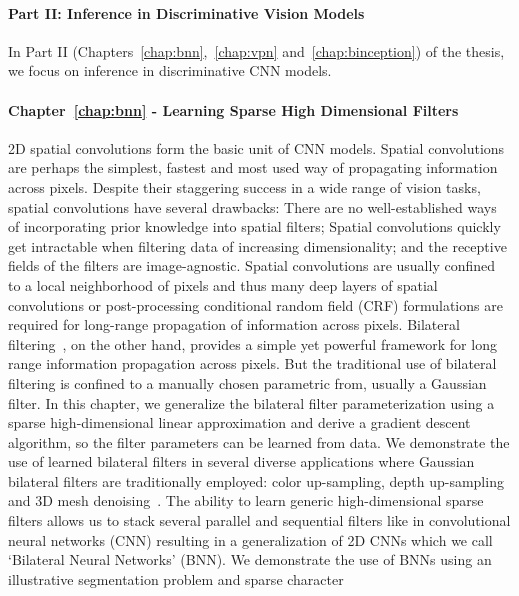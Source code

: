 \vspace{-0.3cm}
\paragraph{Part II: Inference in Discriminative Vision Models}
In Part II (Chapters~\ref{chap:bnn},~\ref{chap:vpn} and~\ref{chap:binception}) of the
thesis, we focus on inference in discriminative CNN models.

\vspace{-0.3cm}
\paragraph{Chapter~\ref{chap:bnn} - Learning Sparse High Dimensional Filters}
2D spatial convolutions form the basic unit of CNN models.
Spatial convolutions are perhaps the simplest, fastest and
most used way of propagating information across pixels.
Despite their staggering success in a
wide range of vision tasks, spatial convolutions have several drawbacks: There
are no well-established ways of incorporating prior knowledge into spatial filters;
Spatial convolutions quickly get intractable when filtering data of
increasing dimensionality; and the receptive fields of the filters are image-agnostic.
Spatial convolutions are usually confined to a local neighborhood
of pixels and thus many deep layers of spatial convolutions or post-processing conditional
random field (CRF) formulations are required for long-range propagation of
information across pixels. Bilateral filtering~\cite{aurich1995non, tomasi1998bilateral},
on the other hand, provides a simple yet powerful
framework for long range information propagation across pixels. But the traditional use of
bilateral filtering is confined to a manually chosen parametric from, usually a Gaussian filter.
In this chapter, we generalize the bilateral filter parameterization using a sparse high-dimensional
linear approximation and derive a gradient descent algorithm, so the filter parameters can be learned from data.
We demonstrate the use of learned bilateral filters in several diverse applications where Gaussian bilateral
filters are traditionally employed: color up-sampling, depth up-sampling~\cite{kopf2007joint}
and 3D mesh denoising~\cite{fleishman2003bilateral}. The ability to learn
generic high-dimensional sparse filters allows us to stack several parallel and sequential filters like in
convolutional neural networks (CNN) resulting in a generalization of 2D CNNs which we call `Bilateral Neural
Networks' (BNN). We demonstrate the use of BNNs using an illustrative segmentation problem and sparse character
